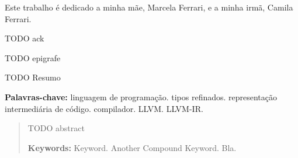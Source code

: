 \documentclass[
    oneside,
    english,
    embeddedlogo,
    noabntexcite
]{ufsc-thesis-rn46-2019}
\begin{document}

\pretextual{}
\imprimircapa{}
\imprimirfolhaderosto*
\protect{}%
\imprimirfolhadecertificacao{}



\begin{dedicatoria}
    Este trabalho é dedicado a minha mãe, Marcela Ferrari, e a minha irmã, Camila Ferrari.
\end{dedicatoria}

\begin{agradecimentos}
    TODO ack
\end{agradecimentos}

\begin{epigrafe}
    TODO epigrafe
\end{epigrafe}

\begin{resumo}[Resumo]
    TODO Resumo

    \vspace{\baselineskip}
    \textbf{Palavras-chave:} linguagem de programação\@. tipos refinados\@. representação intermediária de código\@. compilador\@. LLVM\@. LLVM-IR\@.
\end{resumo}

\begin{abstract}
    TODO abstract

    \vspace{\baselineskip}
    \textbf{Keywords:} Keyword. Another Compound Keyword. Bla.
\end{abstract}

\listoffigures*  %
\end{document}

